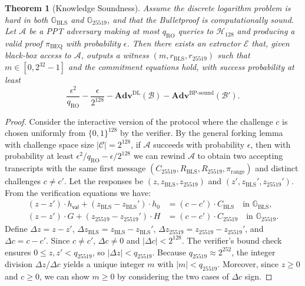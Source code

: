 \documentclass[11pt]{article}
\theoremstyle{definitionstyle}
\newtheorem{theorem}{Theorem}[section]
\theoremstyle{plain}
\newcommand{\advantage}[1]{\mathbf{Adv}^{\mathrm{#1}}}
\begin{document}
\begin{theorem}[Knowledge Soundness]
Assume the discrete logarithm problem is hard in both $\mathbb{G}_{\text{BLS}}$ and $\mathbb{G}_{25519}$, and that the Bulletproof is computationally sound. Let $\mathcal{A}$ be a PPT adversary making at most $q_{\text{RO}}$ queries to $\mathcal{H}_{128}$ and producing a valid proof $\pi_{\text{BEQ}}$ with probability $\epsilon$. Then there exists an extractor $\mathcal{E}$ that, given black-box access to $\mathcal{A}$, outputs a witness $(m, r_{\text{BLS}}, r_{25519})$ such that $m \in [0,2^{32}-1]$ and the commitment equations hold, with success probability at least
\[
\frac{\epsilon^2}{q_{\text{RO}}} - \frac{\epsilon}{2^{128}} - \advantage{DL}(\mathcal{B}) - \advantage{BP\text{-}sound}(\mathcal{B}').
\]
\end{theorem}
\begin{proof}
Consider the interactive version of the protocol where the challenge $c$ is chosen uniformly from $\{0,1\}^{128}$ by the verifier. By the general forking lemma~\cite{PointchevalStern00} with challenge space size $|\mathcal{C}| = 2^{128}$, if $\mathcal{A}$ succeeds with probability $\epsilon$, then with probability at least $\epsilon^2/q_{\text{RO}} - \epsilon/2^{128}$ we can rewind $\mathcal{A}$ to obtain two accepting transcripts with the same first message $(C_{25519}, R_{\text{BLS}}, R_{25519}, \pi_{\text{range}})$ and distinct challenges $c \neq c'$. Let the responses be $(z, z_{\text{BLS}}, z_{25519})$ and $(z', z_{\text{BLS}}', z_{25519}')$. From the verification equations we have:
\begin{align*}
(z - z') \cdot h_{\mathsf{val}} + (z_{\text{BLS}} - z_{\text{BLS}}') \cdot h_0 &= (c - c') \cdot C_{\text{BLS}} \quad \text{in } \mathbb{G}_{\text{BLS}}, \\
(z - z') \cdot G + (z_{25519} - z_{25519}') \cdot H &= (c - c') \cdot C_{25519} \quad \text{in } \mathbb{G}_{25519}.
\end{align*}
Define $\Delta z = z - z'$, $\Delta z_{\text{BLS}} = z_{\text{BLS}} - z_{\text{BLS}}'$, $\Delta z_{25519} = z_{25519} - z_{25519}'$, and $\Delta c = c - c'$. Since $c \neq c'$, $\Delta c \neq 0$ and $|\Delta c| < 2^{128}$. The verifier's bound check ensures $0 \le z, z' < q_{25519}$, so $|\Delta z| < q_{25519}$. Because $q_{25519} \approx 2^{252}$, the integer division $\Delta z / \Delta c$ yields a unique integer $m$ with $|m| < q_{25519}$. Moreover, since $z \ge 0$ and $c \ge 0$, we can show $m \ge 0$ by considering the two cases of $\Delta c$ sign.


\end{proof}
\end{document}
